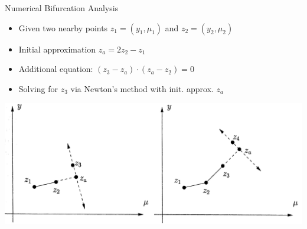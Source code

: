 \documentclass{beamer}
\begin{document}
\begin{frame}{Numerical Bifurcation Analysis}
    
    \begin{itemize}
        \item Given two nearby points $z_{1} = (y_{1}, \mu_{1})$ and $z_2 = (y_2, \mu_2)$
        \item Initial approximation $ z_{a} = 2 z_{2} - z_{1}$
        \item Additional equation: $(z_3 - z_a) \cdot (z_a - z_2) = 0$
        \item Solving for $z_3$ via Newton's method with init. approx. $z_a$
    \end{itemize}
    \includegraphics[width=\textwidth]{grafik/pathfollow}

\end{frame}
\end{document}
